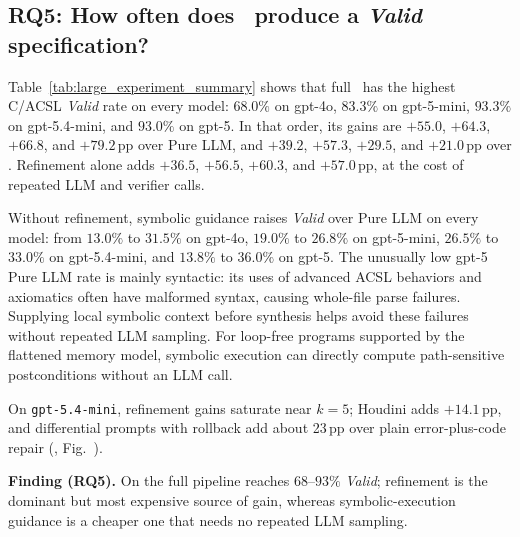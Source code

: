 \subsection{RQ5: How often does \toolname\ produce a \emph{Valid} specification?}
\label{subsec:rq5-valid}



Table~\ref{tab:large_experiment_summary} shows that full \toolname\ has the
highest C/ACSL \emph{Valid} rate on every model: \(68.0\%\) on gpt-4o,
\(83.3\%\) on gpt-5-mini, \(93.3\%\) on gpt-5.4-mini, and \(93.0\%\) on
gpt-5. In that order, its gains are \(+55.0\), \(+64.3\), \(+66.8\), and
\(+79.2\)\,pp over Pure LLM, and \(+39.2\), \(+57.3\), \(+29.5\), and
\(+21.0\)\,pp over \autospec. Refinement alone adds \(+36.5\), \(+56.5\),
\(+60.3\), and \(+57.0\)\,pp, at the cost of repeated LLM and verifier calls.

Without refinement, symbolic guidance raises \emph{Valid} over Pure LLM on
every model: from \(13.0\%\) to \(31.5\%\) on gpt-4o, \(19.0\%\) to
\(26.8\%\) on gpt-5-mini, \(26.5\%\) to \(33.0\%\) on gpt-5.4-mini,
and \(13.8\%\) to \(36.0\%\) on gpt-5. The unusually low gpt-5 Pure LLM
rate is mainly syntactic: its uses of advanced ACSL behaviors and axiomatics
often have malformed syntax, causing whole-file parse failures. Supplying
local symbolic context before synthesis helps avoid these failures without
repeated LLM sampling. For loop-free programs supported by the flattened
memory model, symbolic execution can directly compute path-sensitive
postconditions without an LLM call.

{On \texttt{gpt-5.4-mini}, refinement gains saturate near \(k=5\);
Houdini adds \(+14.1\)\,pp, and differential prompts with rollback add about
23\,pp over plain error-plus-code repair (,
Fig.~).}

\begin{finding}
\textbf{Finding (RQ5).} On \textbf{} the full pipeline reaches $68$--$93\%$ \emph{Valid}; refinement is the dominant but most expensive source of gain, whereas symbolic-execution guidance is a cheaper one that needs no repeated LLM sampling.
\end{finding}
